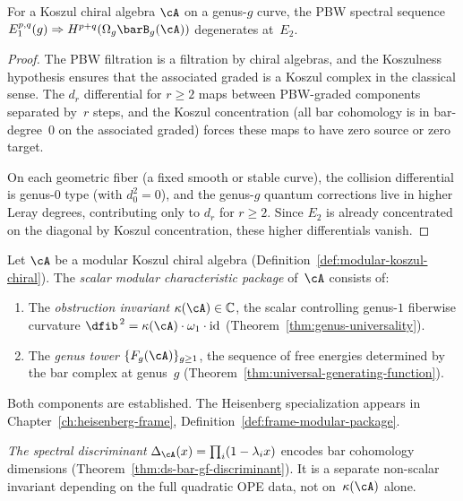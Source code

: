 \begin{lemma}\label{lem:e2-higher-genus}
\ClaimStatusProvedHere
For a Koszul chiral algebra $\cA$ on a genus-$g$ curve, the PBW
spectral sequence
$E_1^{p,q}(g) \Rightarrow H^{p+q}(\Omega_g \barB_g(\cA))$
degenerates at~$E_2$.
\end{lemma}

\begin{proof}
The PBW filtration is a filtration by chiral algebras, and the
Koszulness hypothesis ensures that the associated graded is a
Koszul complex in the classical sense.  The $d_r$ differential
for $r \geq 2$ maps between PBW-graded components separated
by~$r$ steps, and the Koszul concentration (all bar cohomology
is in bar-degree~$0$ on the associated graded) forces these maps
to have zero source or zero target.

On each geometric fiber (a fixed smooth or stable curve), the
collision differential is genus-$0$ type (with $d_0^2 = 0$), and
the genus-$g$ quantum corrections live in higher Leray degrees,
contributing only to $d_r$ for $r \geq 2$.  Since $E_2$ is
already concentrated on the diagonal by Koszul concentration,
these higher differentials vanish.
\end{proof}

\begin{definition}
\label{def:modular-characteristic-package}
\label{def:scalar-modular-package}
Let $\cA$ be a modular Koszul chiral algebra
(Definition~\ref{def:modular-koszul-chiral}).  The
\emph{scalar modular characteristic package} of~$\cA$ consists of:
\begin{enumerate}[label=\textup{(\roman*)}]
\item The \emph{obstruction invariant}
  $\kappa(\cA) \in \mathbb{C}$, the scalar controlling genus-$1$
  fiberwise curvature $\dfib^{\,2} = \kappa(\cA) \cdot \omega_1 \cdot \operatorname{id}$
  (Theorem~\ref{thm:genus-universality}).
\item The \emph{genus tower} $\{F_g(\cA)\}_{g \geq 1}$, the sequence
  of free energies determined by the bar complex at genus~$g$
  (Theorem~\ref{thm:universal-generating-function}).
\end{enumerate}
Both components are established.  The Heisenberg specialization
appears in Chapter~\ref{ch:heisenberg-frame},
Definition~\ref{def:frame-modular-package}.

\smallskip
\emph{The spectral discriminant}
$\Delta_{\cA}(x) = \prod_i (1 - \lambda_i x)$
encodes bar cohomology dimensions
(Theorem~\ref{thm:ds-bar-gf-discriminant}).
It is a separate non-scalar invariant depending on
the full quadratic OPE data, not
on~$\kappa(\cA)$ alone.
\end{definition}

